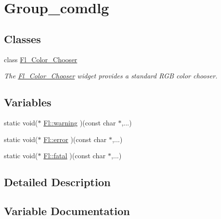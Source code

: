 \hypertarget{group__group__comdlg}{}\section{Group\+\_\+comdlg}
\label{group__group__comdlg}
\subsection*{Classes}
\begin{DoxyCompactItemize}
\item 
class \hyperlink{class_fl___color___chooser}{Fl\+\_\+\+Color\+\_\+\+Chooser}
\begin{DoxyCompactList}\small\item\em The \hyperlink{class_fl___color___chooser}{Fl\+\_\+\+Color\+\_\+\+Chooser} widget provides a standard R\+GB color chooser. \end{DoxyCompactList}\end{DoxyCompactItemize}
\subsection*{Variables}
\begin{DoxyCompactItemize}
\item 
static void($\ast$ \hyperlink{group__group__comdlg_ga915dadc35b73240c89b463a94c1e7d11}{Fl\+::warning} )(const char $\ast$,...)
\item 
static void($\ast$ \hyperlink{group__group__comdlg_ga9acd48aa40a8fb587f361a1f1907f207}{Fl\+::error} )(const char $\ast$,...)
\item 
static void($\ast$ \hyperlink{group__group__comdlg_ga5f072307352192f9f7f8cff31c343526}{Fl\+::fatal} )(const char $\ast$,...)
\end{DoxyCompactItemize}


\subsection{Detailed Description}


\subsection{Variable Documentation}
\mbox{\label{group__group__comdlg_ga9acd48aa40a8fb587f361a1f1907f207}} 

